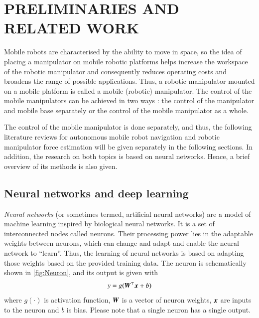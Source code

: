 \chapter{PRELIMINARIES AND RELATED WORK}
\label{chap:Literature}
    
Mobile robots are characterised by the ability to move in space, so the idea of placing a manipulator on mobile robotic platforms helps increase the workspace of the robotic manipulator and consequently reduces operating costs and broadens the range of possible applications. Thus, a robotic manipulator mounted on a mobile platform is called a mobile (robotic) manipulator. The control of the mobile manipulators can be achieved in two ways \cite{Nassal1994}: the control of the manipulator and mobile base separately or the control of the mobile manipulator as a whole.

The control of the mobile manipulator is done separately, and thus, the following literature reviews for autonomous mobile robot navigation and robotic manipulator force estimation will be given separately in the following sections. In addition, the research on both topics is based on neural networks. Hence, a brief overview of its methods is also given.

\section{Neural networks and deep learning}

\emph{Neural networks} (or sometimes termed, artificial neural networks) are a model of machine learning inspired by biological neural networks. It is a set of interconnected nodes called neurons. Their processing power lies in the adaptable weights between neurons, which can change and adapt and enable the neural network to ``learn''. Thus, the learning of neural networks is based on adapting those weights based on the provided training data. The neuron is schematically shown in \cref{fig:Neuron}, and its output is given with
\[
    y = g({\bm{W}}^{\top}{\bm{x}} + b)
    \label{eq:Neuron}
\]
where $g(\cdot)$ is activation function, ${\bm{W}}$ is a vector of neuron weights, ${\bm{x}}$ are inputs to the neuron and $b$ is bias. Please note that a single neuron has a single output.

